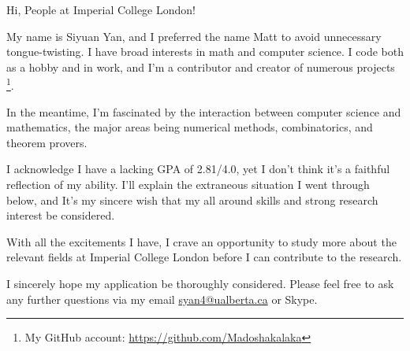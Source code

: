 \documentclass[11pt]{article}
\begin{document}
    Hi, People at Imperial College London!

    My name is Siyuan Yan,
    and I preferred the name Matt to avoid unnecessary tongue-twisting.
    I have broad interests in math and computer science.
    I code both as a hobby and in work, and I'm a contributor and creator of numerous projects
    \footnote{My GitHub account: \url{https://github.com/Madoshakalaka}}.

    In the meantime, I'm fascinated by the interaction between computer science and mathematics,
    the major areas being numerical methods, combinatorics, and theorem provers.

    I acknowledge I have a lacking GPA of 2.81/4.0, yet I don't think it's a faithful reflection of my ability.
    I'll explain the extraneous situation I went through below,
    and It's my sincere wish that my all around skills and strong research interest be considered.


    

    

    

    With all the excitements I have,
    I crave an opportunity to study more about the relevant fields
    at Imperial College London before I can contribute to the research.

    I sincerely hope my application be thoroughly considered.
    Please feel free to ask any further questions via my email \href{mailto:syan4@ualberta.ca}{syan4@ualberta.ca} or
    Skype.
\end{document}
